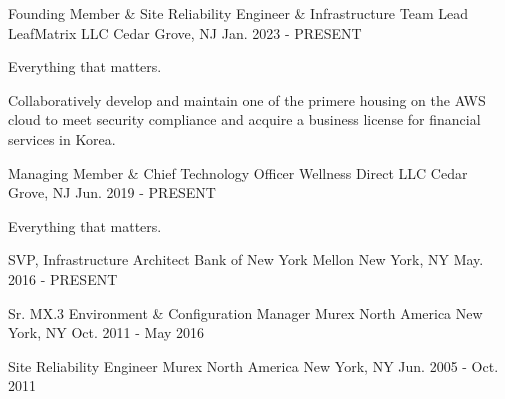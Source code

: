 

\begin{cventries}

  \cventry
    {Founding Member \& Site Reliability Engineer \& Infrastructure Team Lead} %
    {LeafMatrix LLC} %
    {Cedar Grove, NJ} %
    {Jan. 2023 - PRESENT} %
    {
      \begin{cvitems} %
        \item {Everything that matters.}
        \item {Collaboratively develop and maintain one of the primere housing on the AWS cloud to meet security compliance and acquire a business license for financial services in Korea.}
      \end{cvitems}
    }

  \cventry
    {Managing Member \& Chief Technology Officer} %
    {Wellness Direct LLC} %
    {Cedar Grove, NJ} %
    {Jun. 2019 - PRESENT} %
    {
      \begin{cvitems} %
        \item {Everything that matters.}
      \end{cvitems}
    }

  \cventry
    {SVP, Infrastructure Architect} %
    {Bank of New York Mellon} %
    {New York, NY} %
    {May. 2016 - PRESENT} %
    {
    }

  \cventry
    {Sr. MX.3 Environment \& Configuration Manager} %
    {Murex North America} %
    {New York, NY} %
    {Oct. 2011 - May 2016} %
    {
    }

  \cventry
    {Site Reliability Engineer} %
    {Murex North America} %
    {New York, NY} %
    {Jun. 2005 - Oct. 2011} %
    {
    }


\end{cventries}
